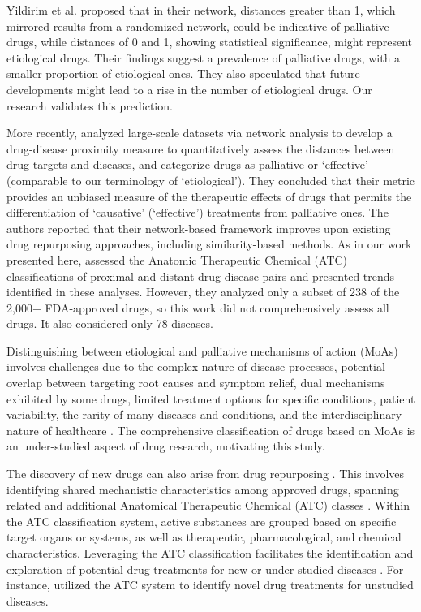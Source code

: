 \documentclass[journal,twoside,web]{ieeecolor}
\begin{document}
Yildirim et al. \cite{yildirim2007drug} proposed that in their network, distances greater than 1, which mirrored results from a randomized network, could be indicative of palliative drugs, while distances of 0 and 1, showing statistical significance, might represent etiological drugs.
Their findings suggest a prevalence of palliative drugs, with a smaller proportion of etiological ones.
They also speculated \cite{yildirim2007drug} that future developments might lead to a rise in the number of etiological drugs.
Our research validates this prediction.

More recently, \cite{guney2016network} analyzed large-scale datasets via network analysis to develop a drug-disease proximity measure to quantitatively assess the distances between drug targets and diseases, and categorize drugs as palliative or `effective' (comparable to our terminology of `etiological'). 
They concluded that their metric provides an unbiased measure of the therapeutic effects of drugs that permits the differentiation of `causative' (`effective') treatments from palliative ones. 
The authors reported that their network-based framework improves upon existing drug repurposing approaches, including similarity-based methods. 
As in our work presented here, \cite{guney2016network} assessed the Anatomic Therapeutic Chemical (ATC) classifications of proximal and distant drug-disease pairs and presented trends identified in these analyses. However, they analyzed only a subset of 238 of the 2,000+ FDA-approved drugs, so this work did not comprehensively assess all drugs. It also considered only 78 diseases.

Distinguishing between etiological and palliative mechanisms of action (MoAs) involves challenges due to the complex nature of disease processes, potential overlap between targeting root causes and symptom relief, dual mechanisms exhibited by some drugs, limited treatment options for specific conditions, patient variability, the rarity of many diseases and conditions, and the interdisciplinary nature of healthcare \cite{yu2020exploring}.
The comprehensive classification of drugs based on MoAs is an under-studied aspect of drug research, motivating this study.

The discovery of new drugs can also arise from drug repurposing \cite{parvathaneni2019drug}.
This involves identifying shared mechanistic characteristics among approved drugs, spanning related and additional Anatomical Therapeutic Chemical (ATC) classes \cite{xue2018review}.
Within the ATC classification system, active substances are grouped based on specific target organs or systems, as well as therapeutic, pharmacological, and chemical characteristics.
Leveraging the ATC classification facilitates the identification and exploration of potential drug treatments for new or under-studied diseases \cite{yang2017literature}.
For instance, \cite{olson2017predicting} utilized the ATC system to identify novel drug treatments for unstudied diseases.
\end{document}
